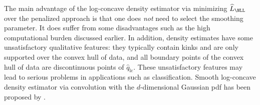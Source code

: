 \documentclass[12pt]{article}
\theoremstyle{definition}
\theoremstyle{theorem}
\theoremstyle{remark}
\begin{document}


The main advantage of the log-concave density estimator via minimizing $\widehat{L}_{\NLL}$ over the penalized approach is that one does \emph{not} need to select the smoothing parameter. It does suffer from some disadvantages such as the high computational burden discussed earlier. In addition, density estimates have some unsatisfactory qualitative features: they typically contain kinks and are only supported over the convex hull of data, and all boundary points of the convex hull of data are discontinuous points of $\hat{q}_{\mathrm{lc}}$. These unsatisfactory features may lead to serious problems in applications such as classification. Smooth log-concave density estimator via convolution with the $d$-dimensional Gaussian pdf has been proposed by \textcite{Chen2013-kj}. 
\end{document}
